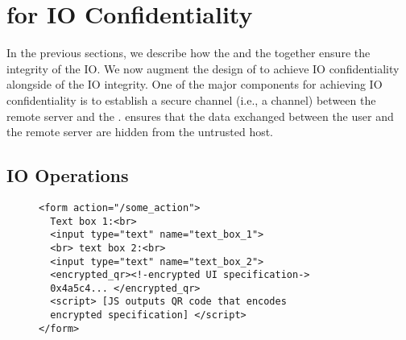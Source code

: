 \iffalse
\begin{figure}[h]
\centering
\texttt{[image: inputPrivacy.pdf]}
\caption{Input Confidentiality}
\label{fig:inputPrivacy}
\centering
\end{figure}
\fi



\section{\name for IO Confidentiality}
\label{sec:confidentiality}


In the previous sections, we describe how the \name \js and the \device together ensure the integrity of the IO. We now augment the design of \name to achieve IO confidentiality alongside of the IO integrity. One of the major components for achieving IO confidentiality is to establish a secure channel (i.e., a \tls channel) between the remote server and the \device. \tls ensures that the data exchanged between the user and the remote server are hidden from the untrusted host.  


\subsection{IO Operations}
\label{sec:confidentiality:io}

\begin{figure}[t]
\small
\begin{lstlisting}[mathescape=true]
<form action="/some_action">
  Text box 1:<br>
  <input type="text" name="text_box_1">
  <br> text box 2:<br>
  <input type="text" name="text_box_2">
  <encrypted_qr><!-encrypted UI specification->
  0x4a5c4... </encrypted_qr>
  <script> [JS outputs QR code that encodes 
  encrypted specification] </script>
</form> 
\end{lstlisting} 
\end{figure}



